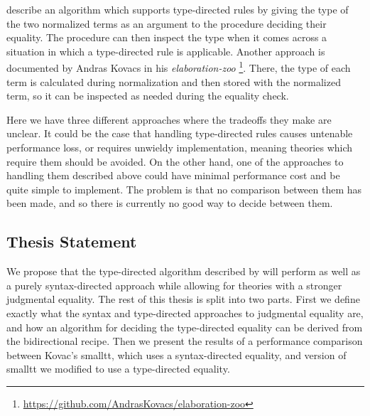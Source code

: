 \documentclass[sigplan,nonacm]{acmart}
\begin{document}
\citet{Chapman2005} describe an algorithm which supports type-directed rules by giving the type of the two normalized terms as an argument to the procedure deciding their equality.
The procedure can then inspect the type when it comes across a situation in which a type-directed rule is applicable.
Another approach is documented by Andras Kovacs in his \textit{elaboration-zoo} \footnote{\url{https://github.com/AndrasKovacs/elaboration-zoo}}.
There, the type of each term is calculated during normalization and then stored with the normalized term, so it can be inspected as needed during the equality check.

Here we have three different approaches where the tradeoffs they make are unclear.
It could be the case that handling type-directed rules causes untenable performance loss, or requires unwieldy implementation, meaning theories which require them should be avoided.
On the other hand, one of the approaches to handling them described above could have minimal performance cost and be quite simple to implement.
The problem is that no comparison between them has been made, and so there is currently no good way to decide between them.

\subsection{Thesis Statement}
We propose that the type-directed algorithm described by \citet{Chapman2005} will perform as well as a purely syntax-directed approach while allowing for theories with a stronger judgmental equality.
The rest of this thesis is split into two parts.
First we define exactly what the syntax and type-directed approaches to judgmental equality are, and how an algorithm for deciding the type-directed equality can be derived from the bidirectional recipe.
Then we present the results of a performance comparison between Kovac's smalltt, which uses a syntax-directed equality, and version of smalltt we modified to use a type-directed equality.
\end{document}
